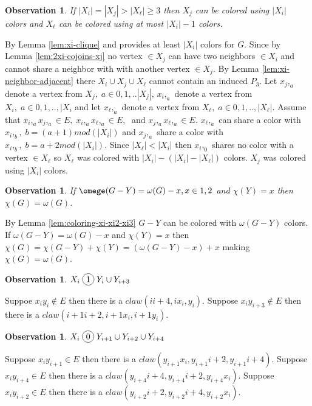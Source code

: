 \documentclass[12pt]{article}
\newcommand*\circled[1]{\tikz[baseline=(char.base)]{
            \node[shape=circle,draw,inner sep=2pt] (char) {#1};}}
\newtheorem{Observation}[Theorem]{Observation}
\begin{document}
\begin{Observation}\label{obs:xi-e-g}
If $|X_i| = |X_j| > |X_\ell| \geq 3$ then $X_j$  can be colored using $|X_i|$ colors and $X_\ell$ can be colored using at most $|X_i| - 1$ colors.
\end{Observation}
 By Lemma \ref{lem:xi-clique} and provides at least $|X_i|$ colors for $G$. Since by Lemma \ref{lem:2xi-cojoins-xj} no vertex $\in X_j$ can have two neighbors $\in X_i$ and cannot share a neighbor with with another vertex $\in X_j$. By Lemma \ref{lem:xi-neighbor-adjacent} there $X_i \cup X_j \cup X_\ell$ cannot contain an induced $P_3$. Let $x_j,_a$ denote a vertex from $X_j,\; a \in {0, 1,..|X_j|}$, $x_i,_a$ denote a vertex from $X_i,\; a \in {0, 1,.., |X_i}$ and let $x_\ell,_a$ denote a vertex from $X_\ell, \; a \in {0, 1,.., |X_\ell|}$. Assume that $x_i,_ax_j,_a \in E,\; x_i,_ax_\ell,_a \in E,\;$ and $ x_j,_ax_\ell,_a \in E$. $x_\ell,_a$ can share a color with $x_i,_{b},\; b = (a +1) mod (|X_i|)$ and $x_j,_a$ share a color with $x_i,_{b},\; b = a+2 mod(|X_i|)$.  Since $|X_\ell| < |X_i|$ then $x_i,_0$ shares no color with a vertex $\in X_\ell$ so $X_\ell$ was colored with $|X_i| - (|X_i| - |X_\ell|)$ colors. $X_j$ was colored using $|X_i|$ colors. 

\begin{Observation}\label{obs:clique-chi}
If $\omege(G - Y) = \omega(G) - x, x \in {1,2}$ and $\chi(Y) = x$ then $\chi(G) = \omega(G)$.
\end{Observation}
 By Lemma \ref{lem:coloring-xi-xi2-xi3} $G - Y$ can be colored with $\omega(G - Y)$ colors. If $\omega(G - Y) = \omega(G) - x$ and $\chi(Y) = x$ then $ \chi(G) = \chi(G - Y) + \chi(Y) = (\omega(G - Y) - x)  + x$ making $\chi(G) = \omega(G)$.

\begin{Observation}\label{obs:xi-joins-yi}
$X_i \; \circled{1} \; Y_i \cup Y_{i+3}$
\end{Observation}
 Suppoe $x_iy_i \not \in E$ then there is a $claw (ii+4, ix_i, y_i)$. Suppose $x_iy_{i+3} \not \in E$ then there is a $claw (i+1i+2, i+1x_i, i+1y_i)$.

\begin{Observation}\label{obs:xi-cojoins-yi}
$X_i \; \circled{0} \; Y_{i+1} \cup Y_{i+2} \cup Y_{i+4}$
\end{Observation}
 Suppose $x_iy_{i+1} \in E$ then there is a $claw (y_{i+1}x_i, y_{i+1}i+2,y_{i+1}i+4)$. Suppose $x_iy_{i+4} \in E$ then there is a $claw (y_{i+4}i+4, y_{i+4}i+2, y_{i+4}x_i)$. Suppose $x_iy_{i+2} \in E$ then there is a $claw (y_{i+2}i+2, y_{i+2}i+4, y_{i+2}x_i)$.
\end{document}

